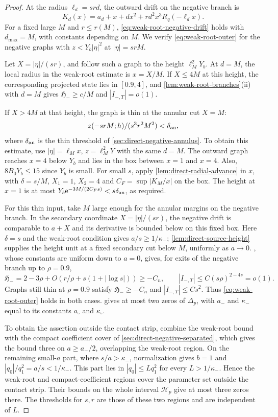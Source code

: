 \begin{proof}
At the radius \(\ell_d=srd\), the outward drift on the negative branch is
\[
 K_d(x)=a_d+x+dx^2+rd^2x^3R_q(-\ell_dx).
\]
For a fixed large \(M\) and \(r\le r(M)\),
\eqref{eq:weak-root-negative-drift} holds with \(d_{\max}=M\), with
constants depending on \(M\). We verify
\eqref{eq:weak-root-outer} for the negative graphs with
\(z<Y_b|\eta|^2\) at \(|\eta|=srM\).

Let \(X=|\eta|/(sr)\), and follow such a graph to the height
\(\ell_M^2Y_b\). At \(d=M\), the local radius in the weak-root estimate
is \(x=X/M\). If \(X\le4M\) at this height, the corresponding projected
state lies in \([0.9,4]\), and
\cref{lem:weak-root-branches}(ii) with \(d=M\) gives
\(\mathfrak H_-\ge c/M\) and \(|I_{-,T}|=o(1)\).

If \(X>4M\) at that height, the graph is thin at the annular cut \(X=M\):
\[
 z(-srM;h)/(s^3r^2M^2)<\delta_{\rm an},
\]
where \(\delta_{\rm an}\) is the thin threshold of
\cref{sec:direct-negative-annulus}. To obtain this estimate, use
\(|\eta|=\ell_Mx\), \(z=\ell_M^2Y\) with the same \(d=M\).
The outward graph reaches \(x=4\) below \(Y_b\) and lies in the box between
\(x=1\) and \(x=4\). Also, \(8B_0Y_b\le15\) since \(Y_b\) is
small. For small \(s\), apply \cref{lem:direct-radial-advance} in
\(x\), with \(\delta=s/M\), \(X_1=1\), \(X_2=4\) and
\(C_F=\sup|K_M/x|\) on the box. The height at \(x=1\) is at most
\(Y_b\mathrm e^{-3M/(2C_Fs)}<s\delta_{\rm an}\), as required.

For this thin input, take \(M\) large enough for the annular margins
on the negative branch. In the secondary coordinate \(X=|\eta|/(sr)\),
the negative drift is comparable to \(a+X\) and its derivative is
bounded below on this fixed box. Here
\(\delta=s\) and the weak-root condition gives \(a/s\ge1/\kappa_-\);
\cref{lem:direct-source-height} supplies the height unit at a fixed
secondary cut below \(M\), uniformly as \(a\to0\).
, whose constants are uniform down
to \(a=0\), gives, for exits of the negative branch up to \(\rho=0.9\),
\[
 \mathfrak H_-=2-3\rho+
                O(r/\rho+s(1+|\log s|))\ge-C_n,\qquad
 |I_{-,T}|\le C(s\rho)^{2-4s}=o(1).
\]
Graphs still thin at \(\rho=0.9\) satisfy \(\mathfrak H_-\ge-C_n\) and
\(|I_{-,T}|\le Cs^2\). Thus \eqref{eq:weak-root-outer} holds in both
cases.  gives at most two zeros of
\(\Delta_p\), with \(a_-\) and \(\kappa_-\) equal to its constants
\(a_\circ\) and \(\kappa_\circ\).

To obtain the assertion outside the contact strip, combine the weak-root
bound with the compact coefficient cover of
\cref{sec:direct-negative-separated}, which gives the bound three on
\(a\ge a_-/2\), overlapping the weak-root region. On the remaining
small-\(a\) part, where \(s/a>\kappa_-\), normalization gives
\(b=1\) and \(|q_0|/q_1^2=a/s<1/\kappa_-\). This part lies in
\(|q_0|\le Lq_1^2\) for every \(L>1/\kappa_-\).
Hence the weak-root and compact-coefficient regions cover the parameter
set outside the contact strip. Their bounds on the whole interval
\(\mathcal H_p\) give at most three zeros there.
The thresholds for \(s,r\) are those of these two regions and are
independent of \(L\).
\end{proof}
